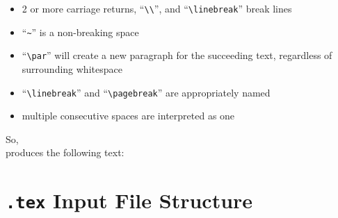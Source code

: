 \begin{itemize}

\item 2 or more carriage returns, ``\texttt{\textbackslash\textbackslash}'', and
  ``\texttt{\textbackslash linebreak}'' break lines

\item ``\texttt{\~}'' is a non-breaking space

\item ``\verb=\par='' will create a new paragraph for the
  succeeding text, regardless of surrounding whitespace

\item ``\verb=\linebreak='' and ``\verb=\pagebreak='' are appropriately
  named

\item multiple consecutive spaces are interpreted as one
\end{itemize}

So, \\



produces the following text:

\begin{framed}
  \begin{minipage}{.5\textwidth}
  
  \end{minipage}
\end{framed}


\section{\texttt{.tex} Input File Structure}

